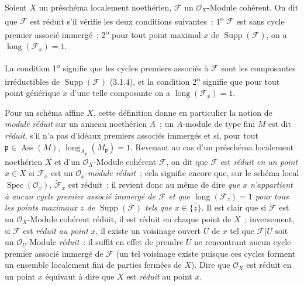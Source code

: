 \begin{definition}[3.2.2]
\label{IV.2.3.2.2-fr}
Soient $X$ un préschéma localement noethérien, $\mathcal F$ un
$\mathcal O_X$-Module cohérent. On dit que $\mathcal F$ est réduit
s'il vérifie les deux conditions suivantes~: 1\textsuperscript{o}
$\mathcal F$ est sans cycle premier associé immergé~; 2\textsuperscript{o}
pour tout point maximal $x$ de $\operatorname{Supp}(\mathcal F)$, on a
$\operatorname{long}(\mathcal F_x)=1$.
\end{definition}

La condition 1\textsuperscript{o} signifie que les cycles premiers associés à
$\mathcal F$ sont les composantes irréductibles de
$\operatorname{Supp}(\mathcal F)$ (3.1.4), et la condition
2\textsuperscript{o} signifie que pour tout point générique $x$ d'une telle
composante on a $\operatorname{long}(\mathcal F_x)=1$.

Pour un schéma affine $X$, cette définition donne en particulier la notion de
\emph{module réduit} sur un anneau noethérien $A$~; un $A$-module de type fini
$M$ est dit \emph{réduit}, s'il n'a pas d'idéaux premiers associés immergés et
si, pour tout $\mathfrak p\in\operatorname{Ass}(M)$,
$\operatorname{long}_{A_\mathfrak p}(M_\mathfrak p)=1$. Revenant au cas d'un
préschéma localement noethérien $X$ et d'un $\mathcal O_X$-Module cohérent
$\mathcal F$, on dit que $\mathcal F$ est \emph{réduit en un point} $x\in X$
si $\mathcal F_x$ est un $\mathcal O_x$-\emph{module réduit}~; cela signifie encore
que, sur le schéma local $\operatorname{Spec}(\mathcal O_x)$,
$\widetilde{\mathcal F}_x$ est réduit~; il revient donc au même de dire
\emph{que $x$ n'appartient à aucun cycle premier associé immergé de
$\mathcal F$ et que $\operatorname{long}(\mathcal F_z)=1$ pour tous les
points maximaux $z$ de $\operatorname{Supp}(\mathcal F)$ tels que
$x\in\overline{\{z\}}$}. Il est clair que si $\mathcal F$ est un
$\mathcal O_X$-Module cohérent réduit, il est réduit en chaque point de $X$~;
inversement, si $\mathcal F$ est \emph{réduit au point} $x$, il existe un
voisinage ouvert $U$ de $x$ tel que $\mathcal F|U$ soit un
$\mathcal O_U$-Module \emph{réduit}~: il suffit en effet de prendre $U$ ne
rencontrant aucun cycle premier associé immergé de $\mathcal F$ (un tel
voisinage existe puisque ces cycles forment un ensemble localement fini de
parties
fermées de $X$). Dire que $\mathcal O_X$ est réduit en un point $x$ équivaut à
dire que $X$ est \emph{réduit} au point $x$.


